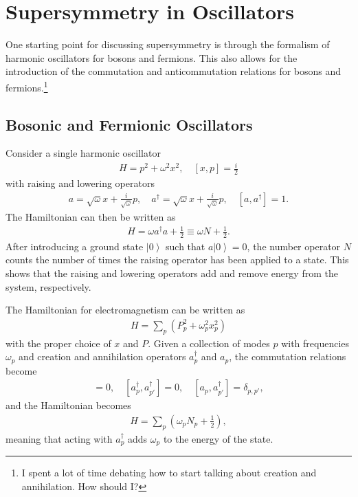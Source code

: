 \documentclass[12pt]{article} %
\renewcommand{\th}[1]{\frac{1}{#1}}
\newcommand{\om}{\omega}
\newcommand{\ket}[1]{\left|#1\right\rangle}
\newcommand{\comm}[2]{\left[#1,#2\right]}
\begin{document}
\section{Supersymmetry in Oscillators}

One starting point for discussing supersymmetry is through the formalism of harmonic oscillators for bosons and fermions. This also allows for the introduction of the commutation and anticommutation relations for bosons and fermions.\footnote{I spent a lot of time debating how to start talking about creation and annihilation. How should I?}

\subsection{Bosonic and Fermionic Oscillators} \emph{}

Consider a single harmonic oscillator 
\begin{align}
H = p^2 +\om^2 x^2,\quad \comm{x}{p} = \frac{i}{2} \label{eqn:harmosc}
\end{align}
with raising and lowering operators
\begin{align}
a = \sqrt{\om}x+\frac{i}{\sqrt{\om}}p,\quad a^\dag = \sqrt{\om}x+\frac{i}{
	\sqrt{\om}}p,\quad \comm{a}{a^\dag } = 1.
\end{align}
The Hamiltonian can then be written as 
\begin{align}
H = \om a^\dag a + \th{2} \equiv \om N + \th{2}.
\end{align}
After introducing a ground state $\ket{0}$ such that $a\ket{0} = 0$, the number operator $N$ counts the number of times the raising operator has been applied to a state. This shows that the raising and lowering operators add and remove energy from the system, respectively. 

The Hamiltonian for electromagnetism can be written as
\begin{align}
H = \sum_p \left(P_p^2 + \om_p^2x_p^2\right)
\end{align}
with the proper choice of $x$ and $P$. Given a collection of modes $p$ with frequencies $\om_p$ and creation and annihilation operators $a_p^\dag$ and $a_p$, the commutation relations become 
\begin{align}
[a_p, a_{p'}] = 0,\quad [a^\dag_p, a^\dag_{p'}]=0, \quad[a_p,a^\dag_{p'}] = 
	\delta_{p,p'},
\end{align}
and the Hamiltonian becomes
\begin{align}
H = \sum_p\left(\om_pN_p+\th{2}\right),
\end{align}
meaning that acting with $a_p^\dag$ adds $\om_p$ to the energy of the state.
\end{document}
